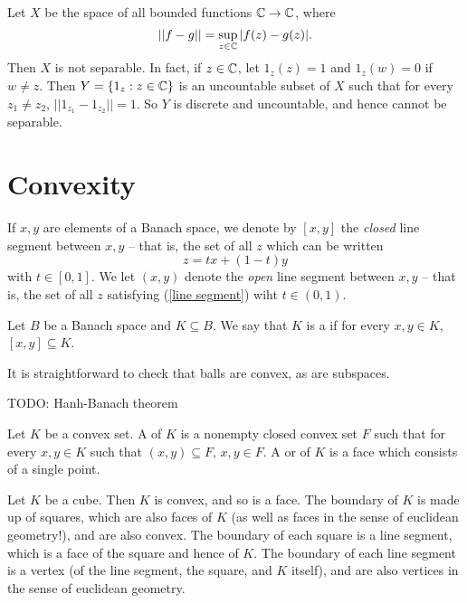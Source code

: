\begin{example}
\label{nonseparable space}
Let $X$ be the space of all bounded functions $\mathbb{C} \to \mathbb{C}$, where
\[||f - g|| = \sup_{z \in \mathbb{C}}|f(z) - g(z)|.\]
Then $X$ is not separable. In fact, if $z \in \mathbb{C}$, let $1_z(z) = 1$ and $1_z(w) = 0$ if $w \neq z$.
Then $Y=\{1_z: z \in \mathbb{C}\}$ is an uncountable subset of $X$ such that for every $z_1 \neq z_2$, $||1_{z_1} - 1_{z_2}|| =1$.
So $Y$ is discrete and uncountable, and hence cannot be separable.
\end{example}

\section{Convexity}
\begin{subsec}
If $x, y$ are elements of a Banach space, we denote by $[x, y]$ the \emph{closed} line segment between $x, y$ -- that is, the set of all $z$ which can be written
\begin{equation}
\label{line segment}
z = tx + (1 - t)y
\end{equation}
with $t \in [0, 1]$.
We let $(x, y)$ denote the \emph{open} line segment between $x, y$ -- that is, the set of all $z$ satisfying (\ref{line segment}) wiht $t \in (0, 1)$.
\end{subsec}

\begin{definition}
Let $B$ be a Banach space and $K \subseteq B$. We say that $K$ is a  if for every $x, y \in K$, $[x, y] \subseteq K$.
\end{definition}

\begin{subsec}
It is straightforward to check that balls are convex, as are subspaces.
\end{subsec}

TODO: Hanh-Banach theorem

\begin{definition}
Let $K$ be a convex set. A  of $K$ is a nonempty closed convex set $F$ such that for every $x,y \in K$ such that $(x, y) \subseteq F$, $x, y \in F$.
A  or  of $K$ is a face which consists of a single point.
\end{definition}

\begin{example}
\label{cube is convex}
Let $K$ be a cube. Then $K$ is convex, and so is a face. The boundary of $K$ is made up of squares, which are also faces of $K$ (as well as faces in the sense of euclidean geometry!), and are also convex. The boundary of each square is a line segment, which is a face of the square and hence of $K$. The boundary of each line segment is a vertex (of the line segment, the square, and $K$ itself), and are also vertices in the sense of euclidean geometry.
\end{example}


